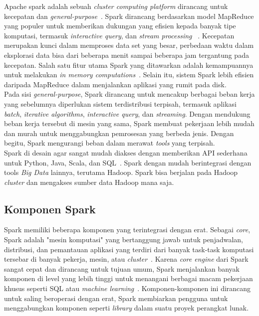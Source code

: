 Apache spark adalah sebuah {\it cluster computing platform} dirancang untuk kecepatan dan {\it general-purpose}~\cite{holdenkarau:07:ls}. Spark dirancang berdasarkan model MapReduce yang populer untuk memberikan dukungan yang efisien kepada banyak tipe komputasi, termasuk {\it interactive query}, dan {\it stream processing} ~\cite{holdenkarau:07:ls}. Kecepatan merupakan kunci dalam memproses data set yang besar, perbedaan waktu dalam eksplorasi data bisa dari beberapa menit sampai beberapa jam tergantung pada kecepatan. Salah satu fitur utama Spark yang ditawarkan adalah kemampuannya untuk melakukan {\it in memory computations}~\cite{holdenkarau:07:ls}. Selain itu, sistem Spark lebih efisien daripada MapReduce dalam menjalankan aplikasi yang rumit pada disk.\\


Pada sisi {\it general-purpose}, Spark dirancang untuk mencakup berbagai beban kerja yang sebelumnya diperlukan sistem terdistribusi terpisah, termasuk aplikasi \textit{batch}, {\it iterative algorithms}, {\it interactive query}, dan \textit{streaming}. Dengan mendukung beban kerja tersebut di mesin yang sama, Spark membuat pekerjaan lebih mudah dan murah untuk menggabungkan pemrosesan yang berbeda jenis. Dengan begitu, Spark mengurangi beban dalam merawat \textit{tools} yang terpisah.\\

Spark di desain agar sangat mudah diakses dengan memberikan API sederhana untuk Python, Java, Scala, dan SQL~\cite{holdenkarau:07:ls}. Spark dengan mudah berintegrasi dengan tools {\it Big Data} lainnya, terutama Hadoop. Spark bisa berjalan pada Hadoop {\it cluster} dan mengakses sumber data Hadoop mana saja.\\

\subsection{Komponen Spark}



Spark memiliki beberapa komponen yang terintegrasi dengan erat. Sebagai {\it core}, Spark adalah "mesin komputasi" yang bertanggung jawab untuk penjadwalan, distribusi, dan pemantauan aplikasi yang terdiri dari banyak task-task komputasi tersebar di banyak pekerja, mesin, atau {\it cluster}~\cite{holdenkarau:07:ls}. Karena {\it core engine} dari Spark sangat cepat dan dirancang untuk tujuan umum, Spark menjalankan banyak komponen di level yang lebih tinggi untuk menangani berbagai macam pekerjaan khusus seperti SQL atau {\it machine learning}~\cite{holdenkarau:07:ls}. Komponen-komponen ini dirancang untuk saling beroperasi dengan erat, Spark membiarkan pengguna untuk menggabungkan komponen seperti {\it library} dalam suatu proyek perangkat lunak.\\

